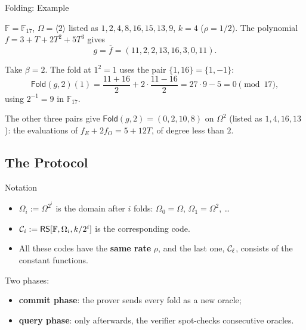 \documentclass{zkdl-presentation-template}
\begin{document}
    \begin{frame}{Folding: Example}
        \begin{example}
            $\mathbb{F} = \mathbb{F}_{17}$, $\Omega = \langle 2 \rangle$ listed as $1, 2, 4, 8, 16, 15, 13, 9$, $k = 4$ ($\rho = 1/2$). The polynomial $f = 3 + T + 2T^2 + 5T^3$ gives
            \begin{equation*}
                g = \overline{f} = (11, 2, 2, 13, 16, 3, 0, 11).
            \end{equation*}
        \end{example}
        \pause

        Take $\beta = 2$. The fold at $1^2 = 1$ uses the pair $\{1, 16\} = \{1, -1\}$:
        \begin{equation*}
            \mathsf{Fold}(g, 2)(1) = \frac{11 + 16}{2} + 2 \cdot \frac{11 - 16}{2} = 27 \cdot 9 - 5 = 0 \pmod{17},
        \end{equation*}
        using $2^{-1} = 9$ in $\mathbb{F}_{17}$.
        \pause

        The other three pairs give $\mathsf{Fold}(g, 2) = (0, 2, 10, 8)$ on $\Omega^2$ (listed as $1, 4, 16, 13$): the evaluations of $f_E + 2 f_O = 5 + 12T$, of degree less than $2$. \cmark
    \end{frame}

    \subsection{The Protocol}

    \begin{frame}{Notation}
        \begin{itemize}
            \item $\Omega_i := \Omega^{2^i}$ is the domain after $i$ folds: $\Omega_0 = \Omega$, $\Omega_1 = \Omega^2$, \ldots\pause
            \item $\mathcal{C}_i := \mathsf{RS}[\mathbb{F}, \Omega_i, k/2^i]$ is the corresponding code.\pause
            \item All these codes have the \textbf{same rate} $\rho$, and the last one, $\mathcal{C}_\ell$, consists of the constant functions.
        \end{itemize}
        \pause

        Two phases:
        \begin{itemize}
            \item \textbf{commit phase}: the prover sends every fold as a new oracle;
            \item \textbf{query phase}: only afterwards, the verifier spot-checks consecutive oracles.
        \end{itemize}
    \end{frame}
\end{document}
